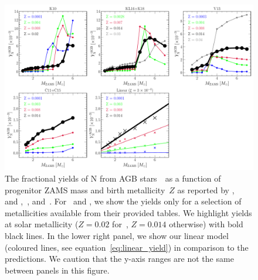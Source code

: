 \documentclass[ms.tex]{subfiles}
\begin{document}
\begin{figure}
\centering
\includegraphics[scale = 0.45]{agb_yield_models.pdf}
\caption{
The fractional yields of N from AGB stars~~as a function of progenitor
ZAMS mass and birth metallicity~$Z$ as reported by
\citet[][upper left]{Karakas2010},~\citet{Karakas2016} and
\citet[][upper middle]{Karakas2018},~\citet[][upper right]{Ventura2013,
Ventura2014, Ventura2018, Ventura2020}, and~\citet[][lower left]{Cristallo2011,
Cristallo2015}.
For~\citet{Ventura2013, Ventura2014, Ventura2018, Ventura2020} and
\citet{Cristallo2011, Cristallo2015}, we show the yields only for a selection
of metallicities available from their provided tables.
We highlight yields at solar metallicity ($Z = 0.02$ for~\citealp{Karakas2010},
$Z = 0.014$ otherwise) with bold black lines.
In the lower right panel, we show our linear model (coloured lines, see
equation~\ref{eq:linear_yield}) in comparison to
the~\citet[][coloured X's]{Cristallo2011, Cristallo2015} predictions.
We caution that the y-axis ranges are not the same between panels in this
figure.
}
\label{fig:agb_yield_models}
\end{figure}
\end{document}
